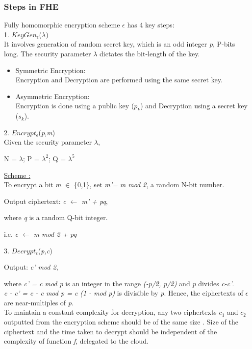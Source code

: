 \subsubsection*{Steps in FHE}
Fully homomorphic encryption scheme $\epsilon$ has 4 key steps:\\
1. $KeyGen_\epsilon$($\lambda$)\\
It involves generation of random secret key, which is an odd integer \textit{p}, P-bits long. The security parameter $\lambda$ dictates the bit-length of the key.
\begin{itemize}
\item Symmetric Encryption: \\
Encryption and Decryption are performed using the same secret key.  
\item Asymmetric Encryption:\\ Encryption is done using a public key ($p_k$) and Decryption using a secret key ($s_k$).
\end{itemize}
2. $Encrypt_\epsilon$(\textit{p,m})\\
Given the security parameter $\lambda$, 
\begin{adjustwidth}{2cm}{}
N = $\lambda$; P = $\lambda^2$; Q = $\lambda^5$
\end{adjustwidth}
\underline{Scheme \cite{gentry2010computing}:}\\
To encrypt a bit \textit{m} $\in$ \{0,1\}, set \textit{m'= m mod 2}, a random N-bit number.
\begin{adjustwidth}{2cm}{}
Output ciphertext: \textit{c $\leftarrow$ m' + pq},
\end{adjustwidth}
where \textit{q} is a random Q-bit integer.
\begin{adjustwidth}{2cm}{}
i.e. \textit{c $\leftarrow$ m mod 2 + pq}
\end{adjustwidth}
3. $Decrypt_\epsilon$(\textit{p,c})
\begin{adjustwidth}{2cm}{}
Output: \textit{c' mod 2}, 
\end{adjustwidth}where \textit{c' = c mod p} is an integer in the range \textit{(-p/2, p/2)} and \textit{p} divides \textit{c-c'}.\\
\textit{c - c' = c - c mod p = c (1 - mod p)} is divisible by \textit{p}. Hence, the ciphertexts of $\epsilon$ are near-multiples of \textit{p}.\\
To maintain a constant complexity for decryption, any two ciphertexts $c_1$ and $c_2$ outputted from the encryption scheme should be of the same size \cite{gentry2010computing}. Size of the ciphertext and the time taken to decrypt should be independent of the complexity of function \textit{f}, delegated to the cloud.\newline\newline
